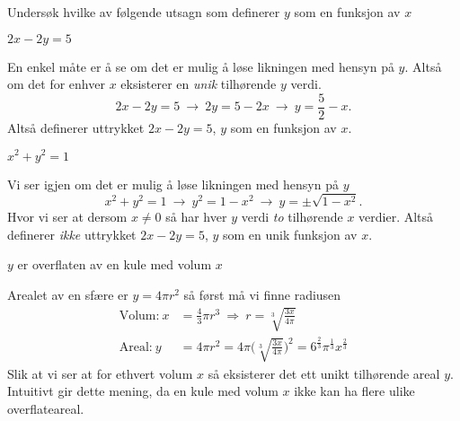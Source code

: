 \documentclass[a4paper,11pt]{article}
\begin{document}

\begin{problem}[5]
    Undersøk hvilke av følgende utsagn som definerer $y$ som en funksjon av $x$
\end{problem}

\begin{subproblem}
    $2x - 2y = 5$ \UiTcorrect
\end{subproblem}

\begin{solution}
    En enkel måte er å se om det er mulig å løse likningen med hensyn på $y$.
    Altså om det for enhver $x$ eksisterer en \emph{unik} tilhørende $y$ verdi.
    \begin{equation}
        2x - 2y = 5
        \ \rightarrow \ 
        2y = 5 - 2x
        \ \rightarrow \
        y = \frac{5}{2} - x.
    \end{equation}
    Altså definerer uttrykket $2x - 2y = 5$, $y$ som en funksjon av $x$.
\end{solution}

\begin{subproblem}
    $x^2 + y^2 = 1$ \UiTwrong
\end{subproblem}

\begin{solution}
    Vi ser igjen om det er mulig å løse likningen med hensyn på $y$
    \begin{equation}
        x^2 + y^2 = 1
        \ \rightarrow \ 
        y^2 = 1 - x^2
        \ \rightarrow \
        y = \pm \sqrt{1 - x^2}.
    \end{equation}
    Hvor vi ser at dersom $x \neq 0$ så har hver $y$ verdi \emph{to} tilhørende $x$
    verdier.
    Altså definerer \emph{ikke} uttrykket $2x - 2y = 5$, $y$ som en unik funksjon av $x$.
\end{solution}

\begin{subproblem}
    $y$ er overflaten av en kule med volum $x$ \UiTwrong
\end{subproblem}

\begin{solution}
    Arealet av en sfære er $y=4\pi r^2$ så først må vi finne radiusen
    \begin{align*} 
        \text{Volum:} \ x &= \frac{4}{3}\pi r^3 \ \Rightarrow \ r = \sqrt[3]{\frac{3x}{4\pi}} \\
        \text{Areal:} \ y &= 4 \pi r^2 = 4 \pi \biggl(\sqrt[3]{\frac{3x}{4\pi}}\biggr)^{2}= 6^{\frac{2}{3}}\pi^{\frac{1}{3}} x^{\frac{2}{3}}
    \end{align*}
    Slik at vi ser at for ethvert volum $x$ så eksisterer det ett unikt tilhørende
    areal $y$. Intuitivt gir dette mening, da en kule med volum $x$ ikke kan ha
    flere ulike overflateareal.
\end{solution}
\end{document}
